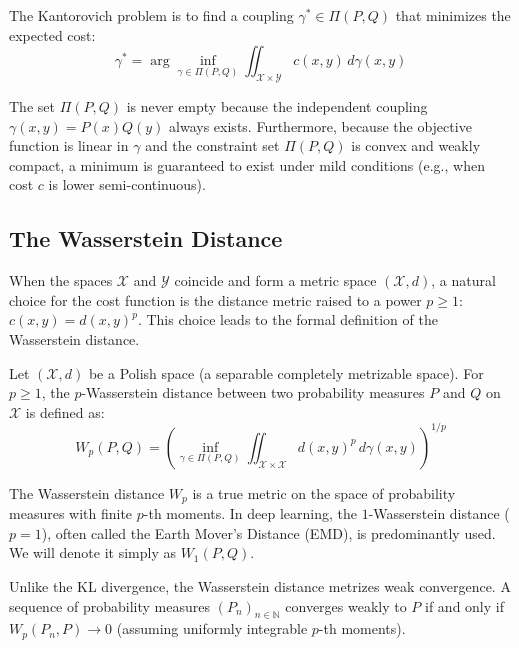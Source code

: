 \begin{definition}
\label{def:kantorovich}
The Kantorovich problem is to find a coupling $\gamma^* \in \Pi(P, Q)$ that minimizes the expected cost:
\[
\gamma^* = \arg\inf_{\gamma \in \Pi(P, Q)} \iint_{\mathcal{X} \times \mathcal{Y}} c(x, y) \, d\gamma(x, y)
\]
\end{definition}

The set $\Pi(P, Q)$ is never empty because the independent coupling $\gamma(x, y) = P(x)Q(y)$ always exists. Furthermore, because the objective function is linear in $\gamma$ and the constraint set $\Pi(P, Q)$ is convex and weakly compact, a minimum is guaranteed to exist under mild conditions (e.g., when cost $c$ is lower semi-continuous).

\subsection{The Wasserstein Distance}
When the spaces $\mathcal{X}$ and $\mathcal{Y}$ coincide and form a metric space $(\mathcal{X}, d)$, a natural choice for the cost function is the distance metric raised to a power $p \geq 1$: $c(x, y) = d(x, y)^p$. This choice leads to the formal definition of the Wasserstein distance.

\begin{definition}
\label{def:wasserstein}
Let $(\mathcal{X}, d)$ be a Polish space (a separable completely metrizable space). For $p \geq 1$, the $p$-Wasserstein distance between two probability measures $P$ and $Q$ on $\mathcal{X}$ is defined as:
\[
W_p(P, Q) = \left( \inf_{\gamma \in \Pi(P, Q)} \iint_{\mathcal{X} \times \mathcal{X}} d(x, y)^p \, d\gamma(x, y) \right)^{1/p}
\]
\end{definition}

The Wasserstein distance $W_p$ is a true metric on the space of probability measures with finite $p$-th moments. 
In deep learning, the $1$-Wasserstein distance ($p=1$), often called the Earth Mover's Distance (EMD), is predominantly used. We will denote it simply as $W_1(P, Q)$.

\begin{theorem}
Unlike the KL divergence, the Wasserstein distance metrizes weak convergence. A sequence of probability measures $(P_n)_{n \in \mathbb{N}}$ converges weakly to $P$ if and only if $W_p(P_n, P) \to 0$ (assuming uniformly integrable $p$-th moments).
\end{theorem}

